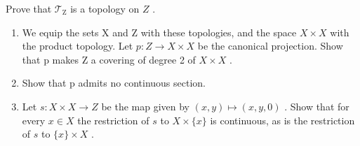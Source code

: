 Prove that \(\mathcal{T}_{\mathrm{Z}}\) is a topology on \(Z\) .

\begin{enumerate}
\def\labelenumi{\alph{enumi})}
\setcounter{enumi}{2}
\item
  We equip the sets X and Z with these topologies, and the space \(X \times X\) with the product topology. Let \(p: Z \to X \times X\) be the canonical projection. Show that p makes Z a covering of degree 2 of \(X \times X\) .
\item
  Show that p admits no continuous section.
\item
  Let \(s: X \times X \to Z\) be the map given by \((x, y) \mapsto (x, y, 0)\) . Show that for every \(x \in X\) the restriction of \(s\) to \(X \times \{x\}\) is continuous, as is the restriction of \(s\) to \(\{x\} \times X\) .
\end{enumerate}


